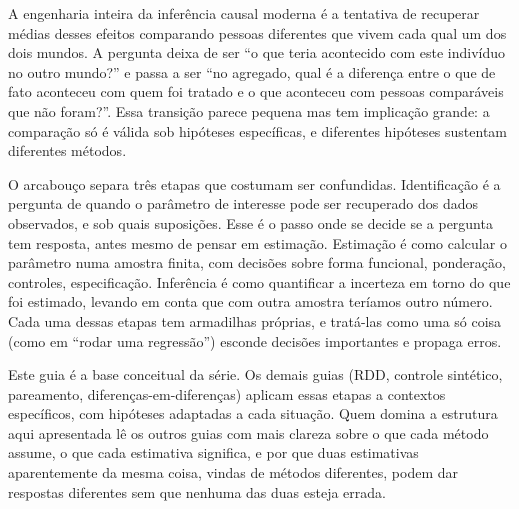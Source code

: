 \documentclass[12pt, a4paper, openany]{book}
\numberwithin{equation}{chapter}
\numberwithin{table}{chapter}
\numberwithin{figure}{chapter}
\begin{document}
A engenharia inteira da inferência causal moderna é a tentativa de
recuperar médias desses efeitos comparando pessoas diferentes que vivem
cada qual um dos dois mundos. A pergunta deixa de ser ``o que teria
acontecido com este indivíduo no outro mundo?'' e passa a ser ``no
agregado, qual é a diferença entre o que de fato aconteceu com quem foi
tratado e o que aconteceu com pessoas comparáveis que não foram?''. Essa
transição parece pequena mas tem implicação grande: a comparação só é
válida sob hipóteses específicas, e diferentes hipóteses sustentam
diferentes métodos.

O arcabouço separa três etapas que costumam ser confundidas. Identificação
é a pergunta de quando o parâmetro de interesse pode ser recuperado dos
dados observados, e sob quais suposições. Esse é o passo onde se decide
se a pergunta tem resposta, antes mesmo de pensar em estimação. Estimação
é como calcular o parâmetro numa amostra finita, com decisões sobre forma
funcional, ponderação, controles, especificação. Inferência é como
quantificar a incerteza em torno do que foi estimado, levando em conta
que com outra amostra teríamos outro número. Cada uma dessas etapas tem
armadilhas próprias, e tratá-las como uma só coisa (como em ``rodar uma
regressão'') esconde decisões importantes e propaga erros.

Este guia é a base conceitual da série. Os demais guias (RDD, controle
sintético, pareamento, diferenças-em-diferenças) aplicam essas etapas a
contextos específicos, com hipóteses adaptadas a cada situação. Quem
domina a estrutura aqui apresentada lê os outros guias com mais clareza
sobre o que cada método assume, o que cada estimativa significa, e por
que duas estimativas aparentemente da mesma coisa, vindas de métodos
diferentes, podem dar respostas diferentes sem que nenhuma das duas
esteja errada.
\newpage

\thispagestyle{empty}
\end{document}
